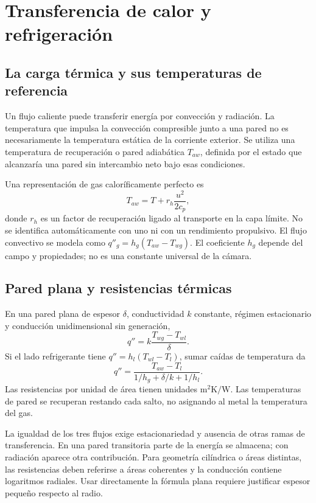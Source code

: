 \chapter{Transferencia de calor y refrigeración}\label{ch:17}
\section{La carga térmica y sus temperaturas de referencia}
Un flujo caliente puede transferir energía por convección y radiación. La temperatura que impulsa la convección compresible junto a una pared no es necesariamente la temperatura estática de la corriente exterior. Se utiliza una temperatura de recuperación o pared adiabática $T_{aw}$, definida por el estado que alcanzaría una pared sin intercambio neto bajo esas condiciones.

Una representación de gas caloríficamente perfecto es
\[
 T_{aw}=T+ r_h\frac{u^2}{2c_p},
\]
donde $r_h$ es un factor de recuperación ligado al transporte en la capa límite. No se identifica automáticamente con uno ni con un rendimiento propulsivo. El flujo convectivo se modela como $q''_g=h_g(T_{aw}-T_{wg})$. El coeficiente $h_g$ depende del campo y propiedades; no es una constante universal de la cámara.\cite{MIT07,MIT09}
\section{Pared plana y resistencias térmicas}
En una pared plana de espesor $\delta$, conductividad $k$ constante, régimen estacionario y conducción unidimensional sin generación,
\[
 q''=k\frac{T_{wg}-T_{wl}}{\delta}.
\]
Si el lado refrigerante tiene $q''=h_l(T_{wl}-T_l)$, sumar caídas de temperatura da
\begin{equation}\label{eq:thermalresistance}
 q''=\frac{T_{aw}-T_l}{1/h_g+\delta/k+1/h_l}.
\end{equation}
Las resistencias por unidad de área tienen unidades $\mathrm{m^2K/W}$. Las temperaturas de pared se recuperan restando cada salto, no asignando al metal la temperatura del gas.

La igualdad de los tres flujos exige estacionariedad y ausencia de otras ramas de transferencia. En una pared transitoria parte de la energía se almacena; con radiación aparece otra contribución. Para geometría cilíndrica o áreas distintas, las resistencias deben referirse a áreas coherentes y la conducción contiene logaritmos radiales. Usar directamente la fórmula plana requiere justificar espesor pequeño respecto al radio.
